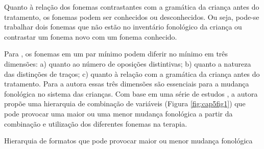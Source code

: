 \documentclass[output=paper,colorlinks,citecolor=brown,booklanguage=portuguese]{langscibook}
\begin{document}
Quanto à relação dos fonemas contrastantes com a gramática da criança antes do tratamento, os fonemas podem ser conhecidos ou desconhecidos. Ou seja, pode-se trabalhar dois fonemas que não estão no inventário fonológico da criança ou contrastar um fonema novo com um fonema conhecido.

Para \citet{Gierut1992}, os fonemas em um par mínimo podem diferir no mínimo em três dimensões: a) quanto ao número de oposições distintivas; b) quanto a natureza das distinções de traços; c) quanto à relação com a gramática da criança antes do tratamento. Para a autora essas três dimensões são essenciais para a mudança fonológica no sistema das crianças. Com base em uma série de estudos \citep{Gierut1989, Gierut1990, Gierut1991, Gierut2001, Gierut1992a}, a autora propõe uma hierarquia de combinação de variáveis (Figura \ref{fig:cap5fig1}) que pode provocar uma maior ou uma menor mudança fonológica a partir da combinação e utilização dos diferentes fonemas na terapia.



\begin{Figura}
    \caption{Hierarquia de formatos que pode provocar maior ou menor mudança fonológica \citep{Mota1996}}
    \label{fig:cap5fig1}
\end{Figura}
\end{document}

